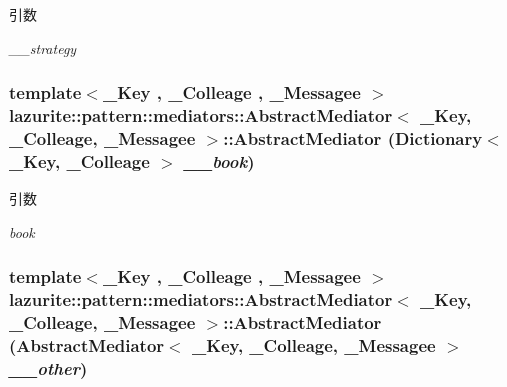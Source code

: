 \begin{DoxyParams}{引数}
\item[{\em \_\-\_\-strategy}]\end{DoxyParams}
\hypertarget{classlazurite_1_1pattern_1_1mediators_1_1_abstract_mediator_3_01___key_00_01___colleage_00_01___messagee_01_4_aae9c4ede6d686f3d101ca3acb96023fa}{
\subsubsection[{AbstractMediator}]{\setlength{\rightskip}{0pt plus 5cm}template$<$\_\-Key , \_\-Colleage , \_\-Messagee $>$ lazurite::pattern::mediators::AbstractMediator$<$ \_\-Key, \_\-Colleage, \_\-Messagee $>$::AbstractMediator (Dictionary$<$ \_\-Key, \_\-Colleage $>$ {\em \_\-\_\-book})}}
\label{classlazurite_1_1pattern_1_1mediators_1_1_abstract_mediator_3_01___key_00_01___colleage_00_01___messagee_01_4_aae9c4ede6d686f3d101ca3acb96023fa}

\begin{DoxyParams}{引数}
\item[{\em book}]\end{DoxyParams}
\hypertarget{classlazurite_1_1pattern_1_1mediators_1_1_abstract_mediator_3_01___key_00_01___colleage_00_01___messagee_01_4_a2b93c855a87570583da80c1a6c3a7f1b}{
\subsubsection[{AbstractMediator}]{\setlength{\rightskip}{0pt plus 5cm}template$<$\_\-Key , \_\-Colleage , \_\-Messagee $>$ lazurite::pattern::mediators::AbstractMediator$<$ \_\-Key, \_\-Colleage, \_\-Messagee $>$::AbstractMediator (AbstractMediator$<$ \_\-Key, \_\-Colleage, \_\-Messagee $>$ {\em \_\-\_\-other})}}
\label{classlazurite_1_1pattern_1_1mediators_1_1_abstract_mediator_3_01___key_00_01___colleage_00_01___messagee_01_4_a2b93c855a87570583da80c1a6c3a7f1b}


